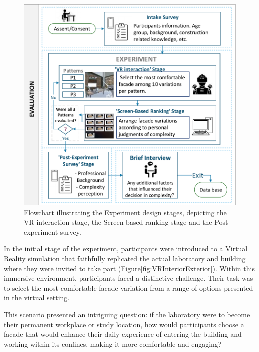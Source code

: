     \begin{figure}[htb]
      \centering
      \includegraphics[width= \linewidth, trim=0 0 0 0, clip]{Images/FlowchartExperiment}
      \caption{Flowchart illustrating the Experiment design stages, depicting the VR interaction stage, the Screen-based ranking stage and the Post-experiment survey.}
      \label{fig:ExperimentFlowchart}
    \end{figure}


In the initial stage of the experiment, participants were introduced to a Virtual Reality simulation that faithfully replicated the actual laboratory and building where they were invited to take part (Figure\ref{fig:VRInteriorExterior}).
Within this immersive environment, participants faced a distinctive challenge.
Their task was to select the most comfortable facade variation from a range of options presented in the virtual setting.

This scenario presented an intriguing question: if the laboratory were to become their permanent workplace or study location, how would participants choose a facade that would enhance their daily experience of entering the building and working within its confines, making it more comfortable and engaging?

